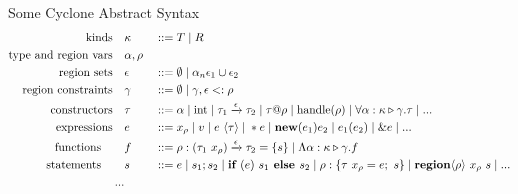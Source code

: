 \documentclass[aspectratio=169]{beamer}
\begin{document}
\begin{frame}{Some Cyclone Abstract Syntax}
\scriptsize{
\begin{alignat*}{2}
\text{kinds}\quad &\kappa &&::= T \; {\color{black}\mid}\; R
\\
\text{type and region vars}\quad &\alpha,\rho &&
\\
\text{region sets}\quad &\epsilon &&::= \emptyset \; {\color{black}\mid}\; \alpha_n \epsilon_1 \cup \epsilon_2
\\
\text{region constraints} \quad &\gamma &&::= \emptyset \; {\color{black}\mid}\; \gamma, \epsilon <: \rho
\\
\text{constructors} \quad &\tau &&::= \alpha \; {\color{black}\mid}\; \text{int} \; {\color{black}\mid}\; \tau_1 \xrightarrow[]{\epsilon} \tau_2 \; {\color{black}\mid}\; \tau @ \rho \; {\color{black}\mid}\; \text{handle}(\rho) \; {\color{black}\mid}\; \forall\alpha:\kappa \triangleright \gamma.\tau \; {\color{black}\mid}\; ...
\\
\text{expressions} \quad &e &&::= x_\rho \; {\color{black}\mid}\; v \; {\color{black}\mid}\; e\ \langle\tau\rangle \; {\color{black}\mid}\; \ast e \; {\color{black}\mid}\; \textbf{new}(e_1)e_2 \; {\color{black}\mid}\; e_1(e_2) \; {\color{black}\mid}\; \&e \; {\color{black}\mid}\; ...
\\
\text{functions} \qquad &f &&::= \rho:(\tau_1\ x_{\rho}) \xrightarrow[]{\epsilon} \tau_2 = \{s\} \; {\color{black}\mid}\; \Lambda\alpha:\kappa \triangleright \gamma.f
\\
\text{statements} \qquad &s &&::= e \; {\color{black}\mid}\; s_1;s_2 \; {\color{black}\mid}\; \textbf{if } (e)\ s_1 \textbf{ else } s_2 \; {\color{black}\mid}\; \rho:\{\tau\ x_\rho = e;\ s\} \; {\color{black}\mid}\; \textbf{region}\langle\rho\rangle\ x_{\rho}\ s \; {\color{black}\mid}\; ...
\\
...
\end{alignat*}
    }
\end{frame}
\end{document}
